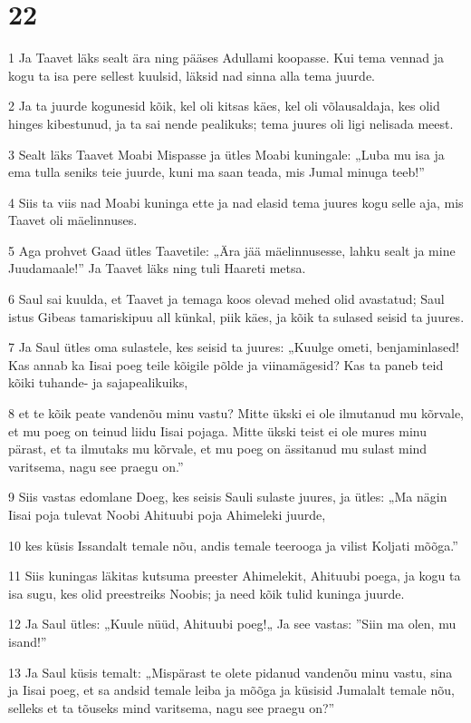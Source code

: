 \chapter{22}

\par 1 Ja Taavet läks sealt ära ning pääses Adullami koopasse. Kui tema vennad ja kogu ta isa pere sellest kuulsid, läksid nad sinna alla tema juurde.
\par 2 Ja ta juurde kogunesid kõik, kel oli kitsas käes, kel oli võlausaldaja, kes olid hinges kibestunud, ja ta sai nende pealikuks; tema juures oli ligi nelisada meest.
\par 3 Sealt läks Taavet Moabi Mispasse ja ütles Moabi kuningale: „Luba mu isa ja ema tulla seniks teie juurde, kuni ma saan teada, mis Jumal minuga teeb!”
\par 4 Siis ta viis nad Moabi kuninga ette ja nad elasid tema juures kogu selle aja, mis Taavet oli mäelinnuses.
\par 5 Aga prohvet Gaad ütles Taavetile: „Ära jää mäelinnusesse, lahku sealt ja mine Juudamaale!” Ja Taavet läks ning tuli Haareti metsa.
\par 6 Saul sai kuulda, et Taavet ja temaga koos olevad mehed olid avastatud; Saul istus Gibeas tamariskipuu all künkal, piik käes, ja kõik ta sulased seisid ta juures.
\par 7 Ja Saul ütles oma sulastele, kes seisid ta juures: „Kuulge ometi, benjaminlased! Kas annab ka Iisai poeg teile kõigile põlde ja viinamägesid? Kas ta paneb teid kõiki tuhande- ja sajapealikuiks,
\par 8 et te kõik peate vandenõu minu vastu? Mitte ükski ei ole ilmutanud mu kõrvale, et mu poeg on teinud liidu Iisai pojaga. Mitte ükski teist ei ole mures minu pärast, et ta ilmutaks mu kõrvale, et mu poeg on ässitanud mu sulast mind varitsema, nagu see praegu on.”
\par 9 Siis vastas edomlane Doeg, kes seisis Sauli sulaste juures, ja ütles: „Ma nägin Iisai poja tulevat Noobi Ahituubi poja Ahimeleki juurde,
\par 10 kes küsis Issandalt temale nõu, andis temale teerooga ja vilist Koljati mõõga.”
\par 11 Siis kuningas läkitas kutsuma preester Ahimelekit, Ahituubi poega, ja kogu ta isa sugu, kes olid preestreiks Noobis; ja need kõik tulid kuninga juurde.
\par 12 Ja Saul ütles: „Kuule nüüd, Ahituubi poeg!„ Ja see vastas: ”Siin ma olen, mu isand!”
\par 13 Ja Saul küsis temalt: „Mispärast te olete pidanud vandenõu minu vastu, sina ja Iisai poeg, et sa andsid temale leiba ja mõõga ja küsisid Jumalalt temale nõu, selleks et ta tõuseks mind varitsema, nagu see praegu on?”
